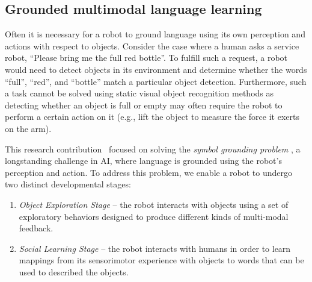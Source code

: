
\subsection{Grounded multimodal language learning}
Often it is necessary
for a robot to ground language using its own perception and actions
with respect to objects.  Consider the case where a human asks a
service robot, ``Please bring me the full red bottle''.  To fulfill
such a request, a robot would need to detect objects in its
environment and determine whether the words ``full'', ``red'', and
``bottle'' match a particular object detection.  Furthermore, such a
task cannot be solved using static visual object recognition methods
as detecting whether an object is full or empty may often require the
robot to perform a certain action on it (e.g., lift the object to
measure the force it exerts on the arm).

This research contribution~\cite{thomason:ijcai16} focused on solving the {\it symbol
grounding problem} \cite{harnad1990symbol}, a longstanding challenge
in AI, where language is grounded using the robot's perception and
action.
To address this problem, we enable a robot to undergo two distinct developmental stages:

\begin{enumerate}
\item {\it Object Exploration Stage} -- the robot interacts with objects using a set of exploratory behaviors designed to produce different kinds of multi-modal feedback.
\item {\it Social Learning Stage} -- the robot interacts with humans in order to learn mappings from its sensorimotor experience with objects to words that can be used to described the objects.
\end{enumerate}


